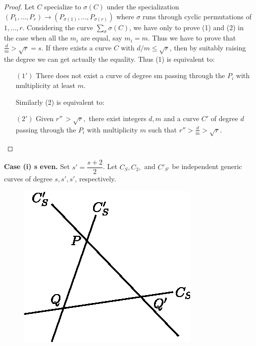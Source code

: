 \begin{proof}
 Let $C$ specialize to $\sigma (C)$ under the specialization $
 (P_1, \ldots , P_r) \rightarrow (P_{\sigma(1)}, \ldots ,
  P_{\sigma(r)})$ where $\sigma$ runs through cyclic
 permutations of $1, \ldots , r$. Considering the curve 
$\underset{\sigma}{\sum} \sigma (C)$, we have only to prove (1) and
 (2) in the case when all the $m_i$ are equal, say $m_i
 =m$. Thus we have to prove that $\frac{d}{m} >  \sqrt{r} =
 s$. If there exists a curve $C$ with $d/m \leq \sqrt{r}$, 
then by suitably raising the degree we can get actually the
equality. Thus (1) is equivalent to:  
\begin{itemize}
\item[{\rm $(1')$}]
 There does not exist a curve of degree sm passing through the 
 $P_i$ with multiplicity at least $m$. 
 
 Similarly (2) is equivalent to: 
 
\item[{\rm $(2')$}] Given $r''\, > \sqrt{r}, $ there exist
  integers $d,  m$ and a curve $C'$ of degree $d$ passing through the
  $ P_i $ with  multiplicity $m$ such that $r'' > \frac{d}{m}
  >  \sqrt{r}$.  
\end{itemize}
\end{proof}

\medskip
{} 
{\textbf{Case (i) s even.}}
 Set $s' =\dfrac{s+2}{2}$. Let $ C_S, C_2, $ and $C'_{S'} $ be
 independent generic curves of degree $s, s' , s'$, respectively.   

\begin{figure}[H]
\centerline{\includegraphics{vol31-figures/fig31-1.eps}}
\end{figure}

